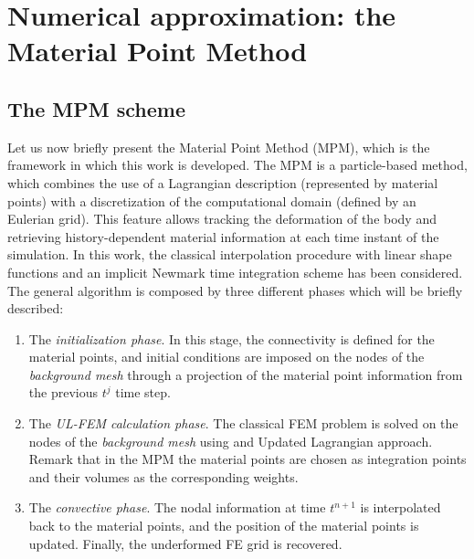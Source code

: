 \documentclass[11pt,english]{article}
\begin{document}
    
%
%
    
    \section{Numerical approximation: the Material Point Method} \label{sec:numerical-approximation}
    \subsection{The MPM scheme} \label{sec: MPM-scheme}
    Let us now briefly present the Material Point Method (MPM), which is the framework in which this work is developed. The MPM is a particle-based method, which combines the use of a Lagrangian description (represented by material points) with a discretization of the computational domain (defined by an Eulerian grid). This feature allows tracking the deformation of the body and retrieving history-dependent material information at each time instant of the simulation. In this work, the classical interpolation procedure with linear shape functions and an implicit Newmark time integration scheme has been considered. The general algorithm is composed by three different phases \cite{sulsky1995application} which will be briefly described:
    
    \begin{enumerate}
         \item The \textit{initialization phase}. In this stage, the connectivity is defined for the material points, and initial conditions are imposed on the nodes of the \textit{background mesh} through a projection of the material point information from the previous $t^j$ time step. 
        \item The \textit{UL-FEM calculation phase}. The classical FEM problem is solved on the nodes of the \textit{background mesh} using and Updated Lagrangian approach. Remark that in the MPM the material points are chosen as integration points and their volumes as the corresponding weights.
        \item The \textit{convective phase}. The nodal information at time $t^{n+1}$ is interpolated back to the material points, and the position of the material points is updated. Finally, the underformed FE grid is recovered.
    \end{enumerate}
\end{document}
